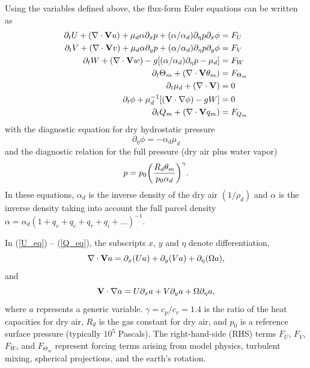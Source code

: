 Using the variables defined above, the flux-form Euler equations can be
written as
%
\begin{align}
\partial_t U + (\nabla \cdot {\bf V}  u)
+ \mu_d \alpha \partial_x p 
+ (\alpha/\alpha_d) \partial_\eta p \partial_x \phi & = F_U \label{U_eq}\\
%
\partial_t V + (\nabla \cdot {\bf V} v ) 
+ \mu_d \alpha \partial_y p
+ (\alpha/\alpha_d) \partial_\eta p \partial_y \phi & = F_V \label{V_eq}\\
%
\partial_t W + (\nabla \cdot {\bf V} w )  
- g [ (\alpha/\alpha_d) \partial_\eta p - \mu_d ] & = F_W \label{W_eq}\\
%
\partial_t \Theta_m + (\nabla \cdot {\bf V} \theta_m )  & = F_{\Theta_m} \label{T_eq}\\
%
\partial_t \mu_d + (\nabla \cdot {\bf V} ) & = 0 \label{mu_eq}\\
%
\partial_t \phi + \mu_d^{-1} [({\bf V} \cdot \nabla \phi ) - gW ] & = 0 \label{phi_eq}\\
%
\partial_t Q_m + (\nabla \cdot {\bf V} q_m ) & = F_{Q_m} \label{Q_eq}
%
\end{align}
\noindent
with the diagnostic equation for dry hydrostatic pressure
%
\begin{equation}
\partial_\eta \phi  = - \alpha_d \mu_d \label{pd_eq}
\end{equation}
%
\noindent
and the diagnostic relation for the 
full pressure (dry air plus water vapor)
%
\begin{equation}
p = p_0 {\left({R_d \theta_m \over p_0 \alpha_d}\right)}^{\gamma}.
\label{ideal_gas_law}
\end{equation}
%
\noindent
In these equations, $\alpha_d$ is the inverse density of the dry air
$(1/\rho_d)$ and $\alpha$ is the inverse density taking into account the
full parcel density 
$\alpha = \alpha_d ( 1 + q_v + q_c + q_r + q_i + ...)^{-1}$. 

In (\ref{U_eq}) -- (\ref{Q_eq}), the subscripts 
$x$, $y$ and $\eta$ denote
differentiation, 
%
\begin{equation}
\nabla \cdot {\bf V } a = \partial_x (Ua) + 
                           \partial_y (Va) + 
                           \partial_\eta (\Omega a),
\notag
\end{equation}
%
\noindent
and
%
\begin{equation}
{\bf V} \cdot \nabla a = U \partial_x a + 
                           V \partial_y a + 
                           \Omega \partial_\eta a,
\notag
\end{equation}
%
\noindent
where $a$ represents a generic variable.  
$\gamma=c_p/c_v = 1.4$ is the ratio of
the heat capacities for dry air, $R_d$ is the gas constant for dry
air, and $p_0$ is a reference surface pressure (typically $10^5$ Pascals).
The right-hand-side (RHS) terms $F_U$, $F_V$, $F_W$, and
$F_{\Theta_m}$ represent forcing terms arising from model physics,
turbulent mixing, spherical projections, and the earth's rotation.

